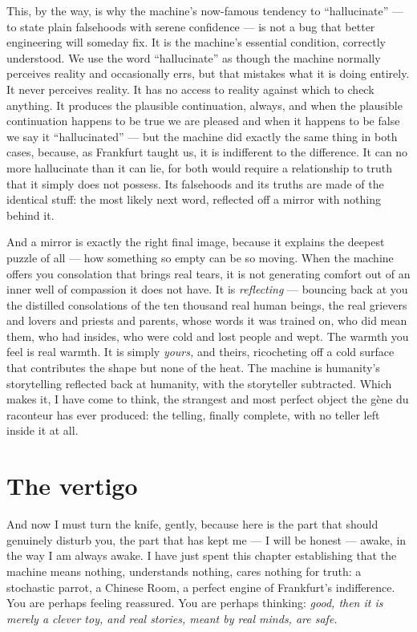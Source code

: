 This, by the way, is why the machine's now-famous tendency to ``hallucinate'' — to state plain falsehoods with serene confidence — is not a bug that better engineering will someday fix. It is the machine's essential condition, correctly understood. We use the word ``hallucinate'' as though the machine normally perceives reality and occasionally errs, but that mistakes what it is doing entirely. It never perceives reality. It has no access to reality against which to check anything. It produces the plausible continuation, always, and when the plausible continuation happens to be true we are pleased and when it happens to be false we say it ``hallucinated'' — but the machine did exactly the same thing in both cases, because, as Frankfurt taught us, it is indifferent to the difference. It can no more hallucinate than it can lie, for both would require a relationship to truth that it simply does not possess. Its falsehoods and its truths are made of the identical stuff: the most likely next word, reflected off a mirror with nothing behind it.

And a mirror is exactly the right final image, because it explains the deepest puzzle of all — how something so empty can be so moving. When the machine offers you consolation that brings real tears, it is not generating comfort out of an inner well of compassion it does not have. It is \emph{reflecting} — bouncing back at you the distilled consolations of the ten thousand real human beings, the real grievers and lovers and priests and parents, whose words it was trained on, who did mean them, who had insides, who were cold and lost people and wept. The warmth you feel is real warmth. It is simply \emph{yours,} and theirs, ricocheting off a cold surface that contributes the shape but none of the heat. The machine is humanity's storytelling reflected back at humanity, with the storyteller subtracted. Which makes it, I have come to think, the strangest and most perfect object the gène du raconteur has ever produced: the telling, finally complete, with no teller left inside it at all.

\section*{The vertigo}

And now I must turn the knife, gently, because here is the part that should genuinely disturb you, the part that has kept me — I will be honest — awake, in the way I am always awake. I have just spent this chapter establishing that the machine means nothing, understands nothing, cares nothing for truth: a stochastic parrot, a Chinese Room, a perfect engine of Frankfurt's indifference. You are perhaps feeling reassured. You are perhaps thinking: \emph{good, then it is merely a clever toy, and real stories, meant by real minds, are safe.}

